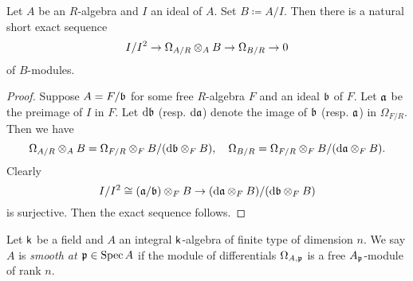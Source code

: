     \begin{theorem}\label{thm: the second exact sequence of differentials}
        Let \(A\) be an \(R\)-algebra and \(I\) an ideal of \(A\).
        Set \(B \coloneqq A/I\).
        Then there is a natural short exact sequence
        \[ I/I^2 \to \Omega_{A/R} \otimes_A B \to \Omega_{B/R} \to 0 \]
        of \(B\)-modules.
    \end{theorem}
    \begin{proof}
        Suppose \(A = F/{\mathfrak{b}}\) for some free \(R\)-algebra \(F\) and an ideal \({\mathfrak{b}}\) of \(F\).
        Let \({\mathfrak{a}}\) be the preimage of \(I\) in \(F\).
        Let \({\mathrm{d}} {\mathfrak{b}}\) (resp. \({\mathrm{d}} {\mathfrak{a}}\)) denote the image of \({\mathfrak{b}}\) (resp. \({\mathfrak{a}}\)) in \(\Omega_{F/R}\).
        Then we have 
        \[ \Omega_{A/R} \otimes_A B = \Omega_{F/R} \otimes_F B / ({\mathrm{d}} {\mathfrak{b}} \otimes_F B), \quad \Omega_{B/R} = \Omega_{F/R} \otimes_F B / ({\mathrm{d}} {\mathfrak{a}} \otimes_F B). \]
        Clearly 
        \[ I/I^2 \cong ({\mathfrak{a}}/{\mathfrak{b}})\otimes_F B \to ({\mathrm{d}} {\mathfrak{a}} \otimes_F B)/({\mathrm{d}} {\mathfrak{b}} \otimes_F B) \]
        is surjective.
        Then the exact sequence follows.
    \end{proof}

    \begin{definition}\label{def: smoothness of affine algebraic varieties}
        Let \({\mathsf{k}}\) be a field and \(A\) an integral \({\mathsf{k}}\)-algebra of finite type of dimension $n$.
        We say \(A\) is \emph{smooth at \({\mathfrak{p}} \in \operatorname{Spec} A\)} if the module of differentials \(\Omega_{A,{\mathfrak{p}}}\) is a free \(A_{\mathfrak{p}}\)-module of rank \(n\).
    \end{definition}

